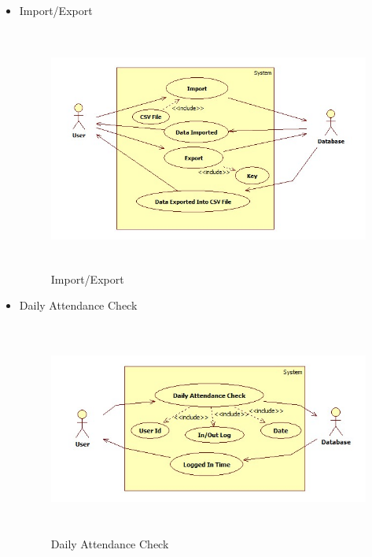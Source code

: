 \newpage
\begin{itemize}
  \item Import/Export
\begin{figure}[h]
\centering
  \includegraphics[width=11.5cm,height=8cm]{Fig6.jpg}
  \caption{Import/Export}\label{Import/Export}
\end{figure}
\end{itemize}

\begin{itemize}
  \item Daily Attendance Check
\begin{figure}[h]
\centering
  \includegraphics[width=11.5cm,height=7cm]{Fig7.jpg}
  \caption{Daily Attendance Check}\label{Daily Attendance Check}
\end{figure}
\end{itemize}

